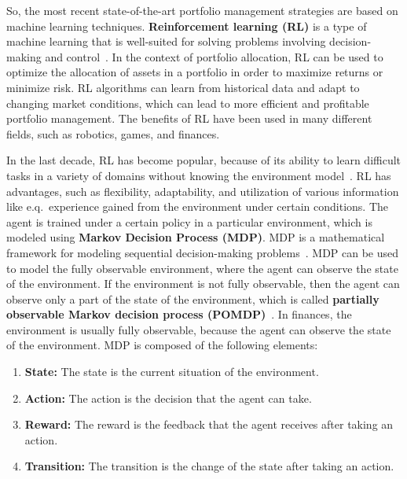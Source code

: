 \documentclass[../xlapes02]{subfiles}
\begin{document}
    So, the most recent state-of-the-art portfolio management strategies are based on machine learning techniques.
    \textbf{Reinforcement learning (RL)} is a type of machine learning that is well-suited for solving problems involving decision-making and control~\cite{sutton2018reinforcement}.
    In the context of portfolio allocation, RL can be used to optimize the allocation of assets in a portfolio in order to maximize returns or minimize risk.
    RL algorithms can learn from historical data and adapt to changing market conditions, which can lead to more efficient and profitable portfolio management.
    The benefits of RL have been used in many different fields, such as robotics, games, and finances.

    In the last decade, RL has become popular, because of its ability to learn difficult tasks in a variety of domains without knowing the environment model~\cite{sutton2018reinforcement}.
    RL has advantages, such as flexibility, adaptability, and utilization of various information like e.q.\ experience gained from the environment under certain conditions.
    The agent is trained under a certain policy in a particular environment, which is modeled using \textbf{Markov Decision Process (MDP)}.
    MDP is a mathematical framework for modeling sequential decision-making problems~\cite{rao2022foundations}.
    MDP can be used to model the fully observable environment, where the agent can observe the state of the environment.
    If the environment is not fully observable, then the agent can observe only a part of the state of the environment, which is called \textbf{partially observable Markov decision process (POMDP)}~\cite{sutton2018reinforcement}.
    In finances, the environment is usually fully observable, because the agent can observe the state of the environment.
    MDP is composed of the following elements:
    \begin{enumerate}[label=\textbf{\arabic*}., ref=\arabic*]
        \item \textbf{State:} The state is the current situation of the environment.
        \item \textbf{Action:} The action is the decision that the agent can take.
        \item \textbf{Reward:} The reward is the feedback that the agent receives after taking an action.
        \item \textbf{Transition:} The transition is the change of the state after taking an action.
    \end{enumerate}
\end{document}
